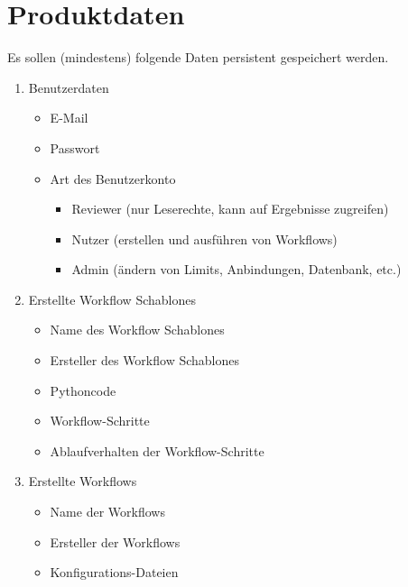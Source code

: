 \chapter{Produktdaten}
Es sollen (mindestens) folgende Daten persistent gespeichert werden.

\renewcommand{\labelenumi}{/PD\arabic{enumi}0/}
 \begin{enumerate}
    \item Benutzerdaten
    \begin{itemize}
        \setlength\itemsep{-1em}
        \item E-Mail
        \item Passwort
        \item Art des Benutzerkonto
        \begin{itemize}
            \setlength\itemsep{-1em}
            \item \gls{Reviewer} (nur Leserechte, kann auf Ergebnisse zugreifen)
            \item \gls{Nutzer} (erstellen und ausführen von Workflows)
            \item \gls{Admin} (ändern von Limits, Anbindungen, Datenbank, etc.)
        \end{itemize}
    \end{itemize}
    
    \item Erstellte \glspl{Workflow Schablone}
        \begin{itemize}
        \setlength\itemsep{-1em}
        \item Name des \glspl{Workflow Schablone}
        \item Ersteller des \glspl{Workflow Schablone}
        \item Pythoncode
        \item \gls{Workflow}-Schritte
        \item Ablaufverhalten der \gls{Workflow}-Schritte
    \end{itemize}
    
    \item Erstellte \glspl{Workflow}
    \begin{itemize}
        \setlength\itemsep{-1em}
        \item Name der \glspl{Workflow}
        \item Ersteller der \glspl{Workflow}
        \item Konfigurations-Dateien
    \end{itemize}
    

\end{enumerate}
